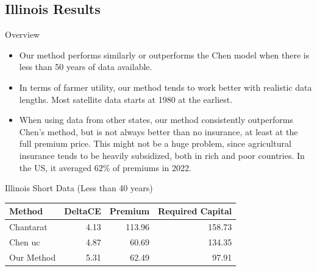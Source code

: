 \documentclass{beamer}
\begin{document}
\subsection{Illinois Results}
\begin{frame}{Overview}
    \begin{itemize}
        \setlength\itemsep{2em}
        \item Our method performs similarly or outperforms the Chen model when there is less than 50 years of data available.  
        \item In terms of farmer utility, our method tends to work better with realistic data lengths. Most satellite data starts at 1980 at the earliest. 
        \item When using data from other states, our method consistently outperforms Chen's method, but is not always better than no insurance, at least at the full premium price. This might not be a huge problem, since agricultural insurance tends to be heavily subsidized, both in rich and poor countries. In the US, it averaged $62\%$ of premiums in 2022. 
    \end{itemize}
\end{frame}


\begin{frame}{Illinois Short Data (Less than 40 years)}
    \begin{table}
        \centering
        \begin{tabular}{lrrr}
            \toprule
            Method & DeltaCE & Premium & Required Capital \\
            \midrule
            Chantarat & 4.13 & 113.96 & 158.73 \\
            Chen uc & 4.87 & 60.69 & 134.35 \\
            Our Method & 5.31 & 62.49 & 97.91 \\
            \bottomrule
            \end{tabular}
    \end{table}
    
        
\end{frame}
\end{document}
